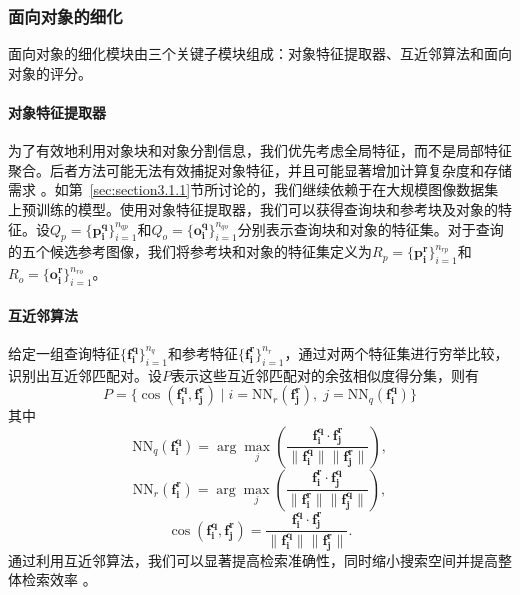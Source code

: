 \subsubsection{面向对象的细化}
\label{subsec:refinement}

面向对象的细化模块由三个关键子模块组成：对象特征提取器、互近邻算法和面向对象的评分。

\vspace{-6pt}
\paragraph{对象特征提取器}

为了有效地利用对象块和对象分割信息，我们优先考虑全局特征，而不是局部特征聚合。后者方法可能无法有效捕捉对象特征，并且可能显著增加计算复杂度和存储需求 \cite{zheng2018sift}。如第~\ref{sec:section3.1.1}节所讨论的，我们继续依赖于在大规模图像数据集上预训练的模型。使用对象特征提取器，我们可以获得查询块和参考块及对象的特征。设\(Q_p=\{\mathbf{p_i^q}\}_{i=1}^{n_{qp}}\)和\(Q_o=\{\mathbf{o_i^q}\}_{i=1}^{n_{qo}}\)分别表示查询块和对象的特征集。对于查询的五个\mbox{候选}参考图像，我们将参考块和对象的特征集定义为\(R_p=\{\mathbf{p_i^r}\}_{i=1}^{n_{rp}}\)和\(R_o=\{\mathbf{o_i^r}\}_{i=1}^{n_{ro}}\)。

\vspace{-6pt}
\paragraph{互近邻算法} 给定一组查询特征\(\{\mathbf{f_i^q}\}_{i=1}^{n_q}\)和参考特征\(\{\mathbf{f_i^r}\}_{i=1}^{n_r}\)，通过对两个特征集进行穷举比较，识别出互近邻匹配对。设\(P\)表示这些互近邻匹配对的余弦相似度得分集，则有
\begin{equation}
    P = \{\cos(\mathbf{f_i^q}, \mathbf{f_j^r}) \mid i = \text{NN}_r(\mathbf{f_j^r}), \; j = \text{NN}_q(\mathbf{f_i^q})\}
    \label{eq:mutual nearest neighbors}
\end{equation}
其中
\begin{equation}
    \text{NN}_q(\mathbf{f_i^q}) = \arg\max_{j} \left( \frac{\mathbf{f_i^q} \cdot \mathbf{f_j^r}}{\|\mathbf{f_i^q}\| \|\mathbf{f_j^r}\|} \right),
\end{equation}
\begin{equation}
    \text{NN}_r(\mathbf{f_i^r}) = \arg\max_{j} \left( \frac{\mathbf{f_i^r} \cdot \mathbf{f_j^q}}{\|\mathbf{f_i^r}\| \|\mathbf{f_j^q}\|} \right),
\end{equation}
\begin{equation}
    \cos(\mathbf{f_i^q}, \mathbf{f_j^r}) = \frac{\mathbf{f_i^q} \cdot \mathbf{f_j^r}}{\|\mathbf{f_i^q}\| \|\mathbf{f_j^r}\|}.
\end{equation}
通过利用互近邻算法，我们可以显著提高检索准确性，同时缩小搜索空间并提高整体检索效率 \cite{zhong2017reranking}。


